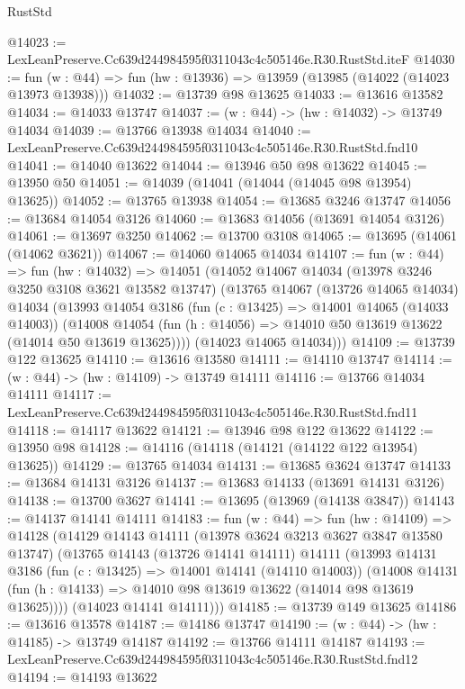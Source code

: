 \begin{lexlean}{RustStd}
\begin{coremodule}
@14023 := LexLeanPreserve.Cc639d244984595f0311043c4c505146e.R30.RustStd.iteF
@14030 := fun (w : @44) => fun (hw : @13936) => @13959 (@13985 (@14022 (@14023 @13973 @13938)))
@14032 := @13739 @98 @13625
@14033 := @13616 @13582
@14034 := @14033 @13747
@14037 := (w : @44) -> (hw : @14032) -> @13749 @14034
@14039 := @13766 @13938 @14034
@14040 := LexLeanPreserve.Cc639d244984595f0311043c4c505146e.R30.RustStd.fnd10
@14041 := @14040 @13622
@14044 := @13946 @50 @98 @13622
@14045 := @13950 @50
@14051 := @14039 (@14041 (@14044 (@14045 @98 @13954) @13625))
@14052 := @13765 @13938
@14054 := @13685 @3246 @13747
@14056 := @13684 @14054 @3126
@14060 := @13683 @14056 (@13691 @14054 @3126)
@14061 := @13697 @3250
@14062 := @13700 @3108
@14065 := @13695 (@14061 (@14062 @3621))
@14067 := @14060 @14065 @14034
@14107 := fun (w : @44) =>
  fun (hw : @14032) =>
  @14051
    (@14052
      @14067
      @14034
      (@13978 @3246 @3250 @3108 @3621 @13582 @13747)
      (@13765
        @14067
        (@13726 @14065 @14034)
        @14034
        (@13993
          @14054
          @3186
          (fun (c : @13425) => @14001 @14065 (@14033 @14003))
          (@14008 @14054 (fun (h : @14056) => @14010 @50 @13619 @13622 (@14014 @50 @13619 @13625))))
        (@14023 @14065 @14034)))
@14109 := @13739 @122 @13625
@14110 := @13616 @13580
@14111 := @14110 @13747
@14114 := (w : @44) -> (hw : @14109) -> @13749 @14111
@14116 := @13766 @14034 @14111
@14117 := LexLeanPreserve.Cc639d244984595f0311043c4c505146e.R30.RustStd.fnd11
@14118 := @14117 @13622
@14121 := @13946 @98 @122 @13622
@14122 := @13950 @98
@14128 := @14116 (@14118 (@14121 (@14122 @122 @13954) @13625))
@14129 := @13765 @14034
@14131 := @13685 @3624 @13747
@14133 := @13684 @14131 @3126
@14137 := @13683 @14133 (@13691 @14131 @3126)
@14138 := @13700 @3627
@14141 := @13695 (@13969 (@14138 @3847))
@14143 := @14137 @14141 @14111
@14183 := fun (w : @44) =>
  fun (hw : @14109) =>
  @14128
    (@14129
      @14143
      @14111
      (@13978 @3624 @3213 @3627 @3847 @13580 @13747)
      (@13765
        @14143
        (@13726 @14141 @14111)
        @14111
        (@13993
          @14131
          @3186
          (fun (c : @13425) => @14001 @14141 (@14110 @14003))
          (@14008 @14131 (fun (h : @14133) => @14010 @98 @13619 @13622 (@14014 @98 @13619 @13625))))
        (@14023 @14141 @14111)))
@14185 := @13739 @149 @13625
@14186 := @13616 @13578
@14187 := @14186 @13747
@14190 := (w : @44) -> (hw : @14185) -> @13749 @14187
@14192 := @13766 @14111 @14187
@14193 := LexLeanPreserve.Cc639d244984595f0311043c4c505146e.R30.RustStd.fnd12
@14194 := @14193 @13622

\end{coremodule}
\end{lexlean}

